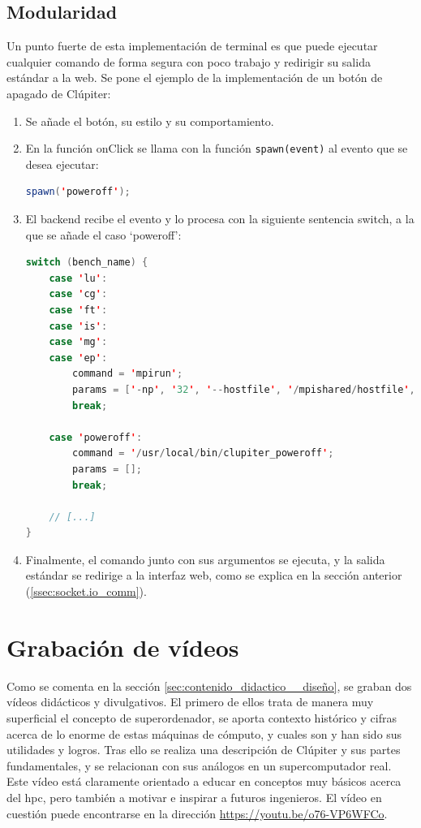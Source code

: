 \subsection{Modularidad}
Un punto fuerte de esta implementación de terminal es que puede ejecutar cualquier comando de forma segura con poco trabajo y redirigir su salida estándar a la web. Se pone el ejemplo de la implementación de un botón de apagado de Clúpiter:

\begin{enumerate}
  \item Se añade el botón, su estilo y su comportamiento.
  \item En la función onClick se llama con la función \texttt{spawn(event)} al evento que se desea ejecutar:
\begin{lstlisting}[language=java]
spawn('poweroff');
\end{lstlisting}
  \item El backend recibe el evento y lo procesa con la siguiente sentencia switch, a la que se añade el caso `poweroff':
\begin{lstlisting}[language=java]
switch (bench_name) {
    case 'lu':
    case 'cg':
    case 'ft':
    case 'is':
    case 'mg':
    case 'ep':
        command = 'mpirun';
        params = ['-np', '32', '--hostfile', '/mpishared/hostfile', '--mca', 'opal_warn_on_missing_libcuda', '0', `/mpishared/NPB3.4.2/NPB3.4-MPI/bin/${bench_name}.*.x`];
        break;

    case 'poweroff':
        command = '/usr/local/bin/clupiter_poweroff';
        params = [];
        break;
    
    // [...]
}
\end{lstlisting}
  \item Finalmente, el comando junto con sus argumentos se ejecuta, y la salida estándar se redirige a la interfaz web, como se explica en la sección anterior (\ref{ssec:socket.io_comm}).
\end{enumerate}

\section{Grabación de vídeos}
Como se comenta en la sección \ref{sec:contenido_didactico__diseño}, se graban dos vídeos didácticos y divulgativos. El primero de ellos trata de manera muy superficial el concepto de superordenador, se aporta contexto histórico y cifras acerca de lo enorme de estas máquinas de cómputo, y cuales son y han sido sus utilidades y logros. Tras ello se realiza una descripción de Clúpiter y sus partes fundamentales, y se relacionan con sus análogos en un supercomputador real. Este vídeo está claramente orientado a educar en conceptos muy básicos acerca del \acrshort{hpc}, pero también a motivar e inspirar a futuros ingenieros. El vídeo en cuestión puede encontrarse en la dirección \url{https://youtu.be/o76-VP6WFCo}.

